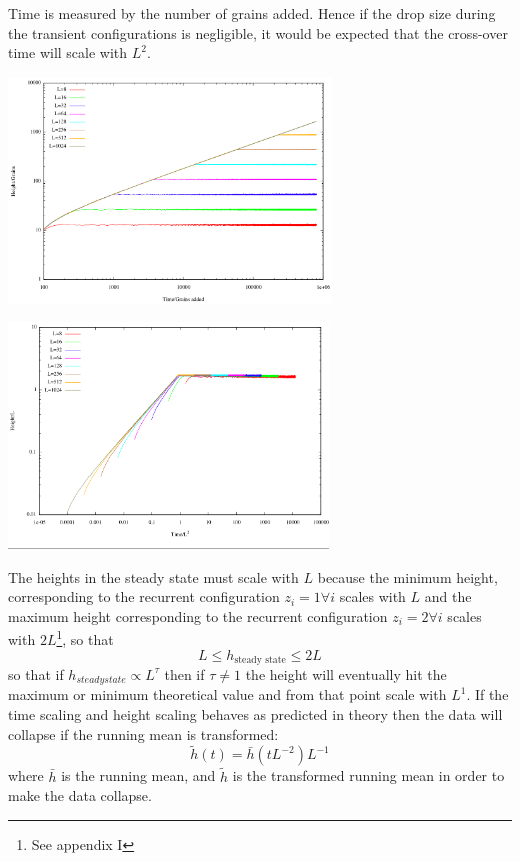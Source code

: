 \documentclass[twoside]{article}
\begin{document}
Time is measured by the number of grains added. Hence if the drop size during the transient configurations is negligible, it would be expected that the cross-over time will scale with $L^2$. 
\begin{multicols}{2}
\begin{center}
  \includegraphics[height=60mm]{hvt-runningmean.png}
\end{center}

\begin{center}
  \includegraphics[height=60mm]{datacollapse.png}
\end{center}

\end{multicols}

The heights in the steady state must scale with $L$ because the minimum height, corresponding to the recurrent configuration $z_i=1 \forall i$ scales with $L$ and the maximum height corresponding to the recurrent configuration $z_i = 2 \forall i$ scales with $2L$\footnote{See appendix I}, so that
\[
L\leq h_{\text{steady state}} \leq 2L
\] 
so that if $ h_{steady state} \propto L^{\tau} $ then if $\tau \neq 1$ the height will eventually hit the maximum or minimum theoretical value and from that point scale with $L^1$. If the time scaling and height scaling behaves as predicted in theory then the data will collapse if the running mean is transformed:
\[
\widetilde{h}(t) = \bar{h} (t L^{-2} ) L^{-1}
\]
where $\bar{h}$ is the running mean, and $\widetilde{h}$ is the transformed running mean in order to make the data collapse.
\end{document}
